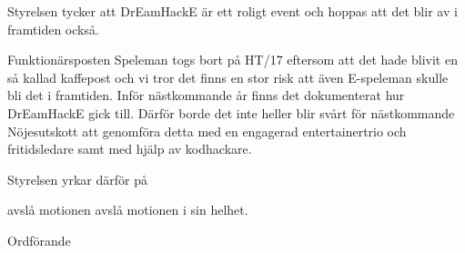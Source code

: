 \documentclass[../_main/handlingar.tex]{subfiles}
\begin{document}
\motionssvar
Styrelsen tycker att DrEamHackE är ett roligt event och hoppas att det blir av i framtiden också. 

Funktionärsposten Speleman togs bort på HT/17 eftersom att det hade blivit en så kallad kaffepost och vi tror det finns en stor risk att även E-speleman skulle bli det i framtiden. Inför nästkommande år finns det dokumenterat hur DrEamHackE gick till.  Därför borde det inte heller blir svårt för nästkommande Nöjesutskott att genomföra detta med en engagerad entertainertrio och fritidsledare samt med hjälp av kodhackare. 

Styrelsen yrkar därför på

\begin{attsatser}
    \att avslå motionen avslå motionen i sin helhet.
\end{attsatser}


\begin{signatures}{1}
	\ist
	\signature{Daniel Bakic}{Ordförande}
\end{signatures}
\end{document}
